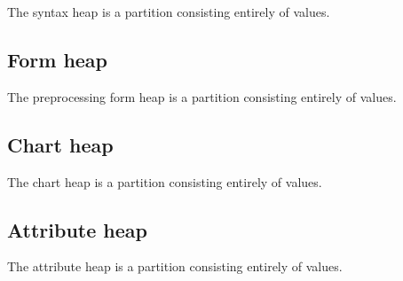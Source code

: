 The syntax heap is a partition consisting entirely of  values.


\subsection{Form heap}
\label{sec:ifc-form-heap}

The preprocessing form heap is a partition consisting entirely of  values.




\subsection{Chart heap}
\label{sec:ifc-chart-heap}

The chart heap is a partition consisting entirely of  values.


\subsection{Attribute heap}
\label{sec:ifc-attr-heap}


The attribute heap is a partition consisting entirely of  values.




